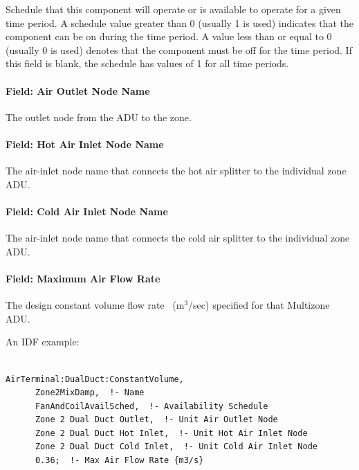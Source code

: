 Schedule that this component will operate or is available to operate for a given time period. A schedule value greater than 0 (usually 1 is used) indicates that the component can be on during the time period. A value less than or equal to 0 (usually 0 is used) denotes that the component must be off for the time period. If this field is blank, the schedule has values of 1 for all time periods.

\paragraph{Field: Air Outlet Node Name}\label{field-air-outlet-node-name-7}

The outlet node from the ADU to the zone.

\paragraph{Field: Hot Air Inlet Node Name}\label{field-hot-air-inlet-node-name}

The air-inlet node name that connects the hot air splitter to the individual zone ADU.

\paragraph{Field: Cold Air Inlet Node Name}\label{field-cold-air-inlet-node-name}

The air-inlet node name that connects the cold air splitter to the individual zone ADU.

\paragraph{Field: Maximum Air Flow Rate}\label{field-maximum-air-flow-rate-7}

The design constant volume flow rate~ (m\(^{3}\)/sec) specified for that Multizone ADU.

An IDF example:

\begin{lstlisting}

AirTerminal:DualDuct:ConstantVolume,
      Zone2MixDamp,  !- Name
      FanAndCoilAvailSched,  !- Availability Schedule
      Zone 2 Dual Duct Outlet,  !- Unit Air Outlet Node
      Zone 2 Dual Duct Hot Inlet,  !- Unit Hot Air Inlet Node
      Zone 2 Dual Duct Cold Inlet,  !- Unit Cold Air Inlet Node
      0.36;  !- Max Air Flow Rate {m3/s}
\end{lstlisting}

